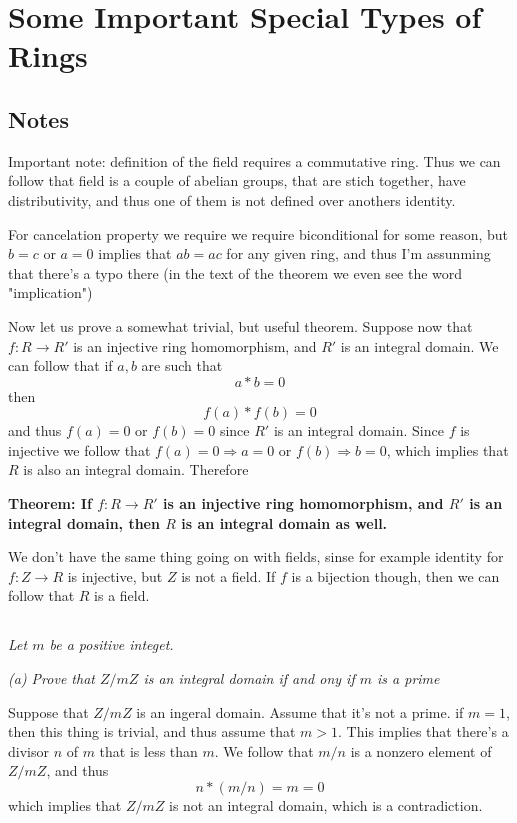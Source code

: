 \documentclass[11pt,oneside,titlepage]{book}
\DeclareMathOperator \ra {\Rightarrow}
\begin{document}
\section{Some Important Special Types of Rings}

\subsection*{Notes}

Important note: definition of the field requires a commutative
ring. Thus we can follow that field is a couple of abelian groups,
that are stich together, have distributivity, and thus one of them is
not defined over anothers identity.

For cancelation property we require we require biconditional for some
reason, but $b = c$ or $a = 0$ implies that $ab = ac$ for any given
ring, and thus I'm assunming that there's a typo there (in the text
of the theorem we even see the word "implication")

Now let us prove a somewhat trivial, but useful theorem.  Suppose now
that $f: R \to R'$ is an injective ring homomorphism, and $R'$ is an
integral domain. We can follow that if $a, b$ are such that
$$a * b = 0$$
then
$$f(a) * f(b) = 0$$
and thus $f(a) = 0$ or $f(b) = 0$ since $R'$ is an integral domain.
Since $f$ is injective we follow that $f(a) = 0 \ra a = 0$ or $f(b)
\ra b = 0$, which implies that $R$ is also an integral domain. Therefore

\textbf{Theorem: If $f: R \to R'$ is an injective ring homomorphism,
and $R'$ is an integral domain, then $R$ is an integral domain as
well.}

We don't have the same thing going on with fields, sinse for example
identity for $f: Z \to R$ is injective, but $Z$ is not a field. If
$f$ is a bijection though, then we can follow that $R$ is a field.


\subsection{}

\textit{Let $m$ be a positive integet.}

\textit{(a) Prove that $Z/mZ$ is an integral domain if and ony if $m$
  is a prime}

Suppose that $Z/mZ$ is an ingeral domain. Assume that it's not a
prime.  if $m = 1$, then this thing is trivial, and thus assume that
$m > 1$.  This implies that there's a divisor $n$ of $m$ that is less
than $m$.  We follow that $m / n$ is a nonzero element of $Z/mZ$, and
thus
$$n * (m / n) = m = 0$$
which implies that $Z/mZ$ is not an integral domain, which is a
contradiction.
\end{document}
